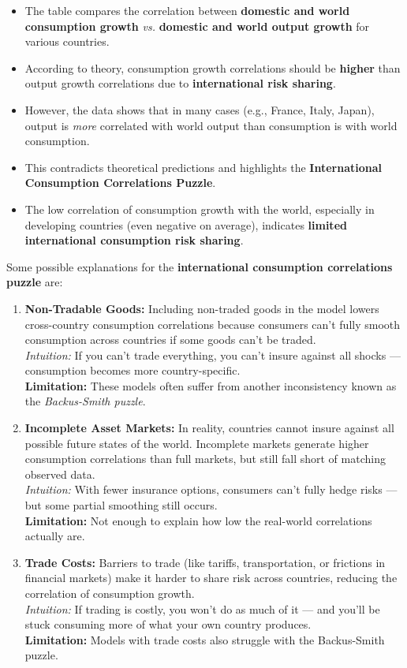 \documentclass[12pt]{article}
\begin{document}
\begin{itemize}
    \item The table compares the correlation between \textbf{domestic and world consumption growth} \textit{vs.} \textbf{domestic and world output growth} for various countries.
    \item According to theory, consumption growth correlations should be \textbf{higher} than output growth correlations due to \textbf{international risk sharing}.
    \item However, the data shows that in many cases (e.g., France, Italy, Japan), output is \textit{more} correlated with world output than consumption is with world consumption.
    \item This contradicts theoretical predictions and highlights the \textbf{International Consumption Correlations Puzzle}.
    \item The low correlation of consumption growth with the world, especially in developing countries (even negative on average), indicates \textbf{limited international consumption risk sharing}.
\end{itemize}

Some possible explanations for the \textbf{international consumption correlations puzzle} are:

\begin{enumerate}
    \item \textbf{Non-Tradable Goods:} Including non-traded goods in the model lowers cross-country consumption correlations because consumers can’t fully smooth consumption across countries if some goods can’t be traded.\\
    \textit{Intuition:} If you can’t trade everything, you can’t insure against all shocks — consumption becomes more country-specific.\\
    \textbf{Limitation:} These models often suffer from another inconsistency known as the \textit{Backus-Smith puzzle}.
    
    \item \textbf{Incomplete Asset Markets:} In reality, countries cannot insure against all possible future states of the world. Incomplete markets generate higher consumption correlations than full markets, but still fall short of matching observed data.\\
    \textit{Intuition:} With fewer insurance options, consumers can't fully hedge risks — but some partial smoothing still occurs.\\
    \textbf{Limitation:} Not enough to explain how low the real-world correlations actually are.
    
    \item \textbf{Trade Costs:} Barriers to trade (like tariffs, transportation, or frictions in financial markets) make it harder to share risk across countries, reducing the correlation of consumption growth.\\
    \textit{Intuition:} If trading is costly, you won’t do as much of it — and you’ll be stuck consuming more of what your own country produces.\\
    \textbf{Limitation:} Models with trade costs also struggle with the Backus-Smith puzzle.
\end{enumerate}
\end{document}
